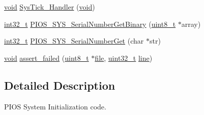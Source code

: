 \begin{DoxyCompactItemize}
\item 
\hyperlink{group___n_a_m_e_ga18028b8badbf1ea7e704ccac3c488e82}{void} \hyperlink{group___p_i_o_s___s_y_s_gab5e09814056d617c521549e542639b7e}{Sys\-Tick\-\_\-\-Handler} (\hyperlink{group___n_a_m_e_ga18028b8badbf1ea7e704ccac3c488e82}{void})
\item 
\hyperlink{group___n_a_m_e_gafd12020da5a235dfcf0c3c748fb5baed}{int32\-\_\-t} \hyperlink{group___p_i_o_s___s_y_s_ga1f6c965ff057830d198c9ba04b6231bb}{P\-I\-O\-S\-\_\-\-S\-Y\-S\-\_\-\-Serial\-Number\-Get\-Binary} (\hyperlink{stdint_8h_aba7bc1797add20fe3efdf37ced1182c5}{uint8\-\_\-t} $\ast$array)
\item 
\hyperlink{group___n_a_m_e_gafd12020da5a235dfcf0c3c748fb5baed}{int32\-\_\-t} \hyperlink{group___p_i_o_s___s_y_s_ga479c4a94bf5fd5f9697498bc63284964}{P\-I\-O\-S\-\_\-\-S\-Y\-S\-\_\-\-Serial\-Number\-Get} (char $\ast$str)
\item 
\hyperlink{group___n_a_m_e_ga18028b8badbf1ea7e704ccac3c488e82}{void} \hyperlink{group___p_i_o_s___s_y_s_ga2532ff72b1a2ff82f65e8c2a5a4dde00}{assert\-\_\-failed} (\hyperlink{stdint_8h_aba7bc1797add20fe3efdf37ced1182c5}{uint8\-\_\-t} $\ast$\hyperlink{group___w_a_v_e_p_l_a_y_e_r___private___variables_ga48b699d30a027a1d6326588c99d716e1}{file}, \hyperlink{stdint_8h_a435d1572bf3f880d55459d9805097f62}{uint32\-\_\-t} \hyperlink{group___p_i_o_s___v_i_d_e_o_ga308d53a9c395c298132110da98adb7c7}{line})
\end{DoxyCompactItemize}


\subsection{Detailed Description}
P\-I\-O\-S System Initialization code. 

